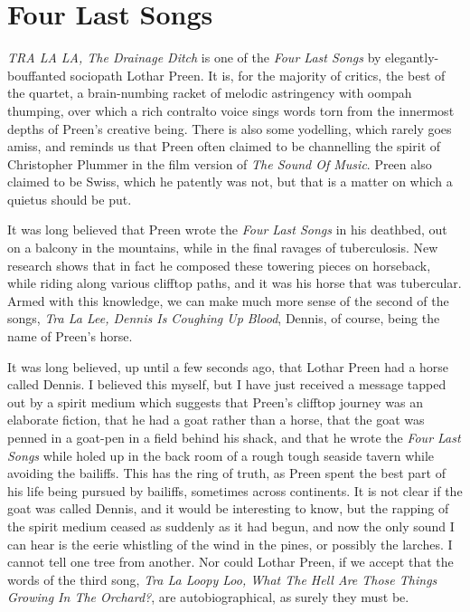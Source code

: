 \chapter{Four Last Songs}

\emph{TRA LA LA, The Drainage Ditch} is one of the \emph{Four Last Songs} by elegantly-bouffanted sociopath Lothar Preen. It is, for the majority of critics, the best of the quartet, a brain-numbing racket of melodic astringency with oompah thumping, over which a rich contralto voice sings words torn from the innermost depths of Preen's creative being. There is also some yodelling, which rarely goes amiss, and reminds us that Preen often claimed to be channelling the spirit of Christopher Plummer in the film version of \emph{The Sound Of Music}. Preen also claimed to be Swiss, which he patently was not, but that is a matter on which a quietus should be put.

It was long believed that Preen wrote the \emph{Four Last Songs} in his deathbed, out on a balcony in the mountains, while in the final ravages of tuberculosis. New research shows that in fact he composed these towering pieces on horseback, while riding along various clifftop paths, and it was his horse that was tubercular. Armed with this knowledge, we can make much more sense of the second of the songs, \emph{Tra La Lee, Dennis Is Coughing Up Blood}, Dennis, of course, being the name of Preen's horse.

It was long believed, up until a few seconds ago, that Lothar Preen had a horse called Dennis. I believed this myself, but I have just received a message tapped out by a spirit medium which suggests that Preen's clifftop journey was an elaborate fiction, that he had a goat rather than a horse, that the goat was penned in a goat-pen in a field behind his shack, and that he wrote the \emph{Four Last Songs} while holed up in the back room of a rough tough seaside tavern while avoiding the bailiffs. This has the ring of truth, as Preen spent the best part of his life being pursued by bailiffs, sometimes across continents. It is not clear if the goat was called Dennis, and it would be interesting to know, but the rapping of the spirit medium ceased as suddenly as it had begun, and now the only sound I can hear is the eerie whistling of the wind in the pines, or possibly the larches. I cannot tell one tree from another. Nor could Lothar Preen, if we accept that the words of the third song, \emph{Tra La Loopy Loo, What The Hell Are Those Things Growing In The Orchard?}, are autobiographical, as surely they must be.

